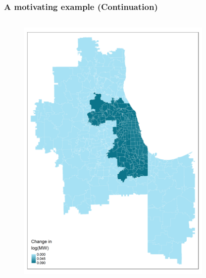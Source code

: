 \documentclass[aspectratio=169, t]{beamer}
\begin{document}
\begin{frame}[label = chi_example]
\frametitle{A motivating example (Continuation)}
    \vspace{-6mm}
    \begin{columns}
        \begin{column}{0.50\textwidth}
            \vspace{-4mm}
            \begin{figure}
                \centering
                \includegraphics[scale = 0.36]{maps_events/output/chicago_2019-6_actual_mw.png}
            \end{figure}   
        \end{column}
        \begin{column}{0.50\textwidth}
            \vspace{-4mm}
            \begin{figure}
                \centering

\end{figure}
\end{column}
\end{columns}
\end{frame}
\end{document}
